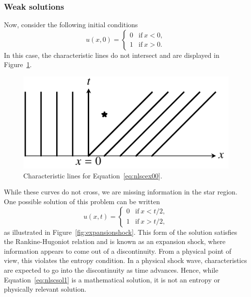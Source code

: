 \subsubsection{Weak solutions}
Now, consider the following initial conditions
\begin{equation}
	u(x,0) = 
	\begin{cases}
		0 & \text{if}~x < 0,\\
		1 & \text{if}~x > 0. 
	\end{cases}
	\label{eq:nlscex00}
\end{equation}
In this case, the characteristic lines do not intersect and are displayed in Figure~\ref{fig:nlscex2}. 
\begin{figure}[htbp]
	\centering
	\includegraphics[width=0.4\linewidth]{Pictures/nonlinear_scalar_entropycond_0}
	\caption{Characteristic lines for Equation~\ref{eq:nlscex00}.}
	\label{fig:nlscex2}
\end{figure}
While these curves do not cross, we are missing information in the star region.  One possible solution of this problem can be written
\begin{equation}
	u(x,t) = 
	\begin{cases}
		0 & \text{if}~x < t/2,\\
		1 & \text{if}~x > t/2,
	\end{cases}
	\label{eq:nlscsol1}
\end{equation}
as illustrated in Figure~\ref{fig:expansionshock}. This form of the solution satisfies the Rankine-Hugoniot relation and is known as an expansion shock, where information appears to come out of a discontinuity. From a physical point of view, this violates the entropy condition. In a physical shock wave, characteristics are expected to go into the discontinuity as time advances. Hence, while Equation~\ref{eq:nlscsol1} is a mathematical solution, it is not an entropy or physically relevant solution. 
